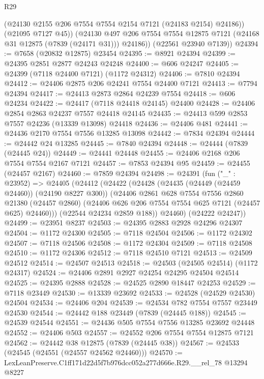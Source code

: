 \begin{lexlean}{R29}
\begin{coremodule}
            (@24130 @2155 @206 @7554 @7554 @2154 @7121 (@24183 @2154) @24186))
          (@21095 @7127 @45))
        (@24130 @497 @206 @7554 @7554 @12875 @7121 (@24168 @31 @12875 (@7839 (@24171 @31))) @24186))
      (@22561 @23940 @7139))
@24394 := @7658 (@20832 @12875) @23454
@24395 := @8921 @24394
@24399 := @24395 @2851 @2877 @24243 @24248
@24400 := @606 @24247
@24405 := @24399 (@7118 @24400 @7121) (@1172 @24312)
@24406 := @7810 @24394
@24412 := @24406 @2875 @206 @24241 @7554 @24400 @7121
@24413 := @7794 @24394
@24417 := @24413 @2873 @2864 @24239 @7554
@24418 := @606 @24234
@24422 := @24417 (@7118 @24418 @24145) @24400
@24428 := @24406 @2854 @2863 @24237 @7557 @24418 @24145
@24435 := @24413 @599 @2853 @7557 @24236 (@13339 @13098) @24418
@24436 := @24406 @481
@24441 := @24436 @2170 @7554 @7556 @13285 @13098
@24442 := @7834 @24394
@24444 := @24442 @24 @13285
@24445 := @7840 @24394
@24448 := @24444 (@7839 (@24445 @24))
@24449 := @24441 @24448
@24455 := @24406 @2168 @206 @7554 @7554 @2167 @7121
@24457 := @7853 @24394 @95
@24459 := @24455 (@24457 @2167)
@24460 := @7859 @24394
@24498 := @24391
    (fun ("_" : @23952) =>
    @24405
      (@24412
        (@24422
          (@24428
            (@24435 (@24449 (@24459 @24460)) (@24190 @8227 @300))
            (@24406
              @2861
              @628
              @7554
              @7556
              @2860
              @21380
              (@24457 @2860)
              (@24406 @626 @206 @7554 @7554 @625 @7121 (@24457 @625) @24460)))
          (@22544 @24234 @2859 @188))
        @24460)
      (@24222 @24247))
@24499 := @23951 @8237
@24503 := @24395 @2883 @2928 @24296 @24307
@24504 := @1172 @24300
@24505 := @7118 @24504
@24506 := @1172 @24302
@24507 := @7118 @24506
@24508 := @1172 @24304
@24509 := @7118 @24508
@24510 := @1172 @24306
@24512 := @7118 @24510 @7121
@24513 := @24509 @24512
@24514 := @24507 @24513
@24518 := @24503 (@24505 @24514) (@1172 @24317)
@24524 := @24406 @2891 @2927 @24254 @24295 @24504 @24514
@24525 := @24395 @2888
@24528 := @24525 @2890 @18447 @24253
@24529 := @7118 @23449
@24530 := @13339 @23692
@24533 := @24528 (@24529 @24530) @24504
@24534 := @24406 @204
@24539 := @24534 @782 @7554 @7557 @23449 @24530
@24544 := @24442 @188 @23449 (@7839 (@24445 @188))
@24545 := @24539 @24544
@24551 := @24436 @505 @7554 @7556 @13285 @23692 @24448
@24552 := @24406 @503
@24557 := @24552 @206 @7554 @7554 @12875 @7121
@24562 := @24442 @38 @12875 (@7839 (@24445 @38))
@24567 := @24533 (@24545 (@24551 (@24557 @24562 @24460)))
@24570 := LexLeanPreserve.C1ff171d22d5f7b976dcc052a277d666e.R29.__rel_78 @13294 @8227

\end{coremodule}
\end{lexlean}
